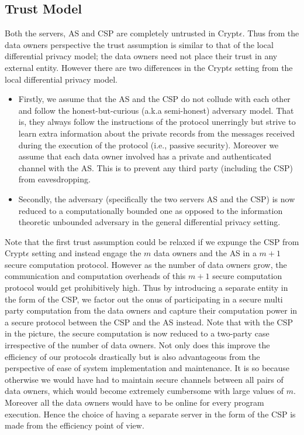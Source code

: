 \subsection{Trust Model}
Both the servers, \textsf{AS} and \textsf{CSP} are completely untrusted in Crypt$\epsilon$. 
Thus from the data owners perspective the trust assumption is similar to that of the local differential privacy model; the data owners need not place their trust in any external entity. 
However there are two differences in the Crypt$\epsilon$ setting from the local differential privacy model.
\begin{itemize}\item Firstly, we assume that the \textsf{AS} and the \textsf{CSP} do not collude with each other and follow the honest-but-curious (a.k.a semi-honest) adversary model. That is, they always follow the instructions of the protocol unerringly but strive to learn extra information about the private records from the messages received during the execution of the protocol (i.e., passive security). Moreover we assume that each data owner involved has a private and authenticated channel with the \textsf{AS}. This is to prevent any third party (including the \textsf{CSP}) from eavesdropping.  \item Secondly, the adversary (specifically the two servers \textsf{AS} and the \textsf{CSP}) is now reduced to a computationally bounded one as opposed to the information theoretic unbounded adversary in the general differential privacy setting.\end{itemize}
Note that the first trust assumption could be relaxed if we expunge the \textsf{CSP} from Crypt$\epsilon$ setting and instead engage the $m$ data owners and the \textsf{AS} in a $m+1$ secure computation protocol. However as the number of data owners grow, the communication and computation overheads of this $m+1$ secure computation protocol would get prohibitively high. Thus by introducing a separate entity in the form of the \textsf{CSP}, we factor out the onus of participating in a secure multi party computation from the data owners and capture their computation power in a secure protocol between the \textsf{CSP} and the \textsf{AS} instead. Note that with the \textsf{CSP} in the picture, the secure computation is now reduced to a two-party case irrespective of the number of data owners. Not only does this improve the efficiency of our protocols drastically but is also advantageous from the perspective of ease of system implementation and maintenance. It is so because otherwise we would have had to maintain secure channels between all pairs of data owners, which would become extremely cumbersome with large values of $m$. Moreover all the data owners would have to be online for every program execution. Hence the choice of having a separate server in the form of the \textsf{CSP} is made from the efficiency point of view.
